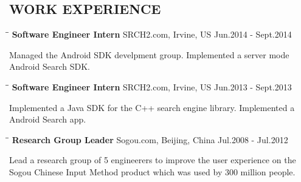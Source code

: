\documentclass{res}
\begin{document}
 


\address{jianfeng.jia@gmail.com (949) 639-9248}
                                  
\begin{resume}

\section{WORK EXPERIENCE}
   \vspace{-0.1in}	
   \begin{tabbing}
   \hspace{2in}\= \hspace{3in}\= \kill %
    {\bf Software Engineer Intern} \>SRCH2.com, Irvine, US     \>Jun.2014 - Sept.2014\\
   \end{tabbing}\vspace{-30pt}      %
   Managed the Android SDK develpment group. Implemented a server mode Android Search SDK. 
   \vspace{-0.1in}	
   \begin{tabbing}
   \hspace{2in}\= \hspace{3in}\= \kill %
    {\bf Software Engineer Intern} \>SRCH2.com, Irvine, US     \>Jun.2013 - Sept.2013\\
   \end{tabbing}\vspace{-30pt}      %
   Implemented a Java SDK for the C++ search engine library. Implemented a Android Search app.
   \vspace{-0.1in}	
   \begin{tabbing}
   \hspace{2in}\= \hspace{3in}\= \kill %
    {\bf Research Group Leader} \>Sogou.com, Beijing, China     \>Jul.2008 - Jul.2012\\
   \end{tabbing}\vspace{-30pt}      %
   Lead a research group of 5 engineerers to improve the user experience on the Sogou Chinese Input Method product which was used by 300 million people. 

\end{resume}
\end{document}
